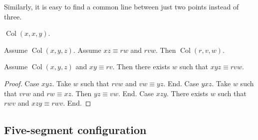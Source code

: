 \documentclass{article}
\newcommand{\Cong}[4]{#1 #2 \equiv #3 #4}
\newcommand{\Betw}[3]{#1 #2 #3}
\newcommand{\Col}[3]{\operatorname{Col}(#1, #2, #3)}
\newcommand{\SenaryCong}[6]{#1 #2 #3 \equiv #4 #5 #6}
\begin{document}
  Similarly, it is easy to find a common line between just two points instead of three.

  \begin{forthel}
    \begin{lemma} %
      $\Col{x}{x}{y}$.
    \end{lemma}

    \begin{lemma} %
      Assume $\Col{x}{y}{z}$.
      Assume $\Cong{x}{z}{r}{w}$ and $\Betw{r}{v}{w}$.
      Then $\Col{r}{v}{w}$.
    \end{lemma}

    \begin{axiom} %
      Assume $\Col{x}{y}{z}$ and $\Cong{x}{y}{r}{v}$.
      Then there exists $w$ such that $\SenaryCong{x}{y}{z}{r}{v}{w}$.
    \end{axiom}
  \end{forthel}

  \begin{proof}
    Case $\Betw{x}{y}{z}$.
    Take $w$ such that $\Betw{r}{v}{w}$ and $\Cong{v}{w}{y}{z}$.
    End.
    Case $\Betw{y}{x}{z}$.
    Take $w$ such that $\Betw{v}{r}{w}$ and $\Cong{r}{w}{x}{z}$.
    Then $\Cong{y}{z}{v}{w}$.
    End.
    Case $\Betw{x}{z}{y}$.
    There exists $w$ such that $\Betw{r}{w}{v}$ and $\SenaryCong{x}{z}{y}{r}{w}{v}$.
    End.
  \end{proof}

  \subsection{Five-segment configuration}
\end{document}
